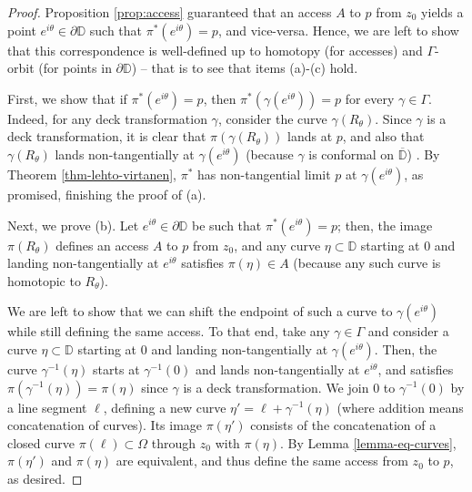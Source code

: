 \documentclass[11pt,a4paper,reqno]{amsart}
\theoremstyle{plain}
\theoremstyle{definition}
\theoremstyle{plain}
\def\DD{\mathbb{D}}
\begin{document}
\begin{proof}
Proposition \ref{prop:access} guaranteed that an access $A$ to $p$ from $z_0$ yields a point $e^{i\theta}\in\partial\DD$ such that $\pi^*(e^{i\theta}) = p$, and vice-versa. Hence, we are left to show that this correspondence is well-defined up to homotopy (for accesses) and $\Gamma$-orbit (for points in $\partial \DD$) -- that is to see that items (a)-(c) hold.

First, we show that if $\pi^*(e^{i\theta}) = p$, then $\pi^*(\gamma(e^{i\theta})) = p$ for every $\gamma\in\Gamma$. Indeed, for any deck transformation $\gamma$, consider the curve $\gamma(R_\theta)$. Since $\gamma$ is a deck transformation,  it is clear that $\pi(\gamma(R_\theta))$ lands at $p$, and also that $\gamma(R_\theta)$ lands non-tangentially at $\gamma(e^{i\theta})$ (because $\gamma$ is conformal on $\overline{\DD}$) . By Theorem \ref{thm-lehto-virtanen}, $\pi^*$ has non-tangential limit $p$ at $\gamma(e^{i\theta})$, as promised, finishing the proof of (a).

Next, we prove (b). Let $e^{i\theta}\in\partial\DD$ be such that $\pi^*(e^{i\theta}) = p$; then, the image $\pi(R_\theta)$ defines an access $A$ to $p$ from $z_0$, and any curve $\eta\subset\DD$ starting at $0$ and landing non-tangentially at $e^{i\theta}$ satisfies $\pi(\eta)\in A$ (because any such curve is homotopic to $R_\theta$). 

We are left to show that we can shift the endpoint of such a curve to $\gamma(e^{i\theta})$ while still defining the same access. To that end, take any $\gamma\in\Gamma$ and consider a curve $\eta\subset\DD$ starting at $0$ and landing non-tangentially at $\gamma(e^{i\theta})$. Then, the curve $\gamma^{-1}(\eta)$ starts at $\gamma^{-1}(0)$ and lands non-tangentially at $e^{i\theta}$, and satisfies $\pi(\gamma^{-1}(\eta)) = \pi(\eta)$ since $\gamma$ is a deck transformation. We join $0$ to $\gamma^{-1}(0)$ by a line segment $\ell$, defining a new curve $\eta' = \ell + \gamma^{-1}(\eta)$ (where addition means concatenation of curves).  Its image $\pi(\eta')$ consists of the concatenation of a closed curve $\pi(\ell)\subset\Omega$ through $z_0$  with $\pi(\eta)$. By Lemma \ref{lemma-eq-curves}, $\pi(\eta')$ and $\pi(\eta)$ are equivalent, and thus define  the same access from $ z_0 $ to $ p $, as desired.


\end{proof}
\end{document}
